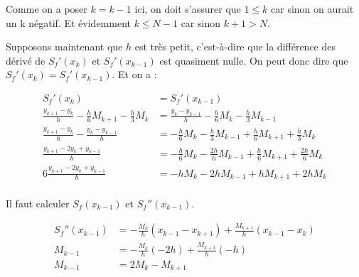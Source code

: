 \documentclass{article}
\begin{document}
\begin{enumerate}
\begin{enumerate}
    Comme on a poser $k = k - 1$ ici, on doit s'assurer que $1 \le k$
    car sinon on aurait un k négatif. Et évidemment $k \le N - 1$ car
    sinon $k + 1 > N$. \newline \newline

    Supposons maintenant que $h$ est très petit, c'est-à-dire que la
    différence des dérivé de $S_f'(x_k)$ et $S_f'(x_{k - 1})$ est
    quasiment nulle. On peut donc dire que $S_f'(x_k) = S_f'(x_{k -
      1})$. Et on a :

    \begin{equation*}
      \begin{split}
        S_f'(x_k) & = S_f'(x_{k - 1}) \\
        \frac{y_{k + 1} - y_k}{h} - \frac{h}{6} M_{k + 1} -
        \frac{h}{3} M_k
        & = \frac{y_k - y_{k - 1}}{h} - \frac{h}{6} M_k -
        \frac{h}{3} M_{k - 1} \\
        \frac{y_{k + 1} - y_k}{h} - \frac{y_k - y_{k - 1}}{h}
        & =  - \frac{h}{6} M_k - \frac{h}{3} M_{k - 1}
        + \frac{h}{6} M_{k + 1} + \frac{h}{3} M_k\\
        \frac{y_{k + 1} - 2 y_k + y_{k - 1}}{h}
        & =  - \frac{h}{6} M_k - \frac{2h}{6} M_{k - 1}
        + \frac{h}{6} M_{k + 1} + \frac{2h}{6} M_k\\
        6 \frac{y_{k + 1} - 2 y_k + y_{k - 1}}{h}
        & =  - h M_k - 2h M_{k - 1}
        + h M_{k + 1} + 2h M_k\\
      \end{split}
    \end{equation*}

    Il faut calculer $S_f(x_{k - 1})$ et $S_f''(x_{k - 1})$.

    \begin{equation*}
      \begin{split}
        S_f''(x_{k - 1}) & = - \frac{M_k}{h} (x_{k - 1} - x_{k + 1}) + 
        \frac{M_{k + 1}}{h} (x_{k - 1} - x_k)\\
        M_{k - 1} & = - \frac{M_k}{h} (-2h) + 
        \frac{M_{k + 1}}{h} (-h)\\
        M_{k - 1} & = 2 M_k - M_{k + 1}\\
      \end{split}
    \end{equation*}


\end{enumerate}
\end{enumerate}
\end{document}
